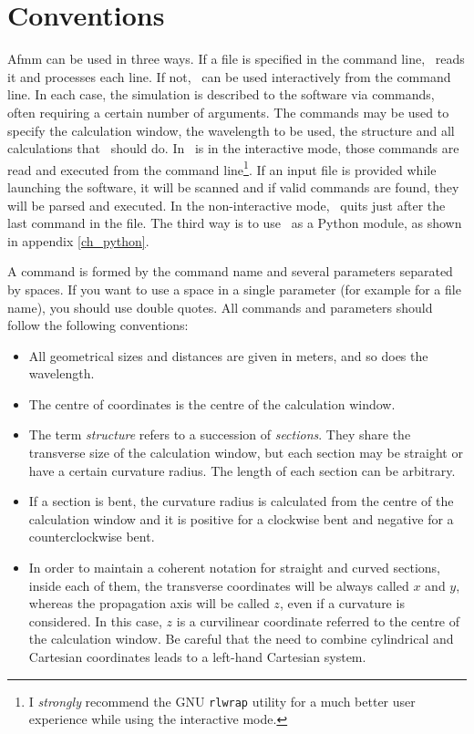 \section{Conventions}

\textsf{Afmm} can be used in three ways.  If a file is specified in the command line, \afmm\ reads it and processes each line. If not, \afmm\ can be used interactively from the command line. 
In each case, the simulation is described to the software via commands, often requiring a certain number of arguments. The commands may be used to specify the calculation window, the wavelength to be used, the structure and all calculations that \afmm\ should do.
In \afmm\ is in the interactive mode, those commands  are read and executed from the command line\footnote{I \textit{strongly} recommend the GNU \lstinline!rlwrap! utility for a much better user experience while using the interactive mode\cite{rlwrap_site}.}. 
If an input file is provided while launching the software, it will be scanned and if valid commands are found, they will be parsed and executed. In the non-interactive mode, \afmm\ quits just after the last command in the file.
The third way is to use \afmm\ as a Python module, as shown in appendix \ref{ch_python}.

A command is formed by the command name and several parameters separated by spaces. If you want to use a space in a single parameter (for example for a file name), you should use double quotes. 
All commands and parameters should follow the following conventions:
\begin{itemize}
\item All geometrical sizes and distances are given in meters, and so does the wavelength.
\item The centre of coordinates is the centre of the calculation window.
\item The term \textit{structure} refers to a succession of \textit{sections}. They share the transverse size of the calculation window, but each section may  be straight or have a certain curvature radius. The length of each section can be arbitrary.
\item If a section is bent, the curvature radius is calculated from the centre of the calculation window and it is positive for a clockwise bent and negative for a counterclockwise bent. 
\item In order to maintain a coherent notation for straight and curved sections, inside each of them, the transverse coordinates will be always called $x$ and $y$, whereas the propagation axis will be called $z$, even if a curvature is considered. In this case, $z$ is a curvilinear coordinate referred to the centre of the calculation window. Be careful that the need to combine cylindrical and Cartesian coordinates leads to a left-hand Cartesian system.

\end{itemize}

